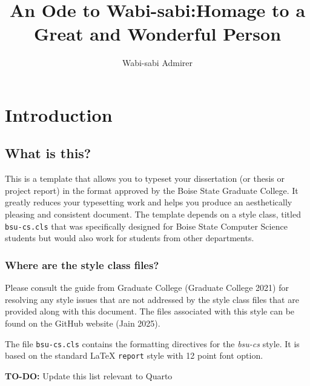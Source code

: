 \documentclass[
  dissertation]{bsu-cs}
\title{An Ode to Wabi-sabi:\titleBreak Homage to a Great and Wonderful
Person}
\author{Wabi-sabi Admirer}
\begin{document}
\frontmatter

\buildFrontPages

% 




\mainmatter

\chapter{Introduction} \label{ch-intro}

\section{What is this?}\label{what-is-this}

This is a template that allows you to typeset your dissertation (or
thesis or project report) in the format approved by the Boise State
Graduate College. It greatly reduces your typesetting work and helps you
produce an aesthetically pleasing and consistent document. The template
depends on a style class, titled \texttt{bsu-cs.cls} that was
specifically designed for Boise State Computer Science students but
would also work for students from other departments.

\subsection{Where are the style class
files?}\label{where-are-the-style-class-files}

Please consult the guide from Graduate College (Graduate College 2021)
for resolving any style issues that are not addressed by the style class
files that are provided along with this document. The files associated
with this style can be found on the GitHub website (Jain 2025).

The file \texttt{bsu-cs.cls} contains the formatting directives for the
\emph{bsu-cs} style. It is based on the standard LaTeX \texttt{report}
style with 12 point font option.

\textbf{TO-DO:} Update this list relevant to Quarto
\end{document}
